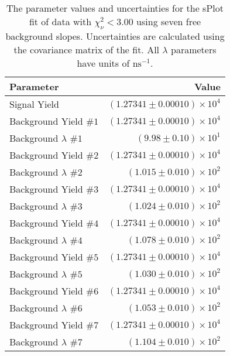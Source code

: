 
\begin{table}[ht]
    \begin{center}
        \begin{tabular}{lr}\toprule
            Parameter & Value \\\midrule
            Signal Yield & $(1.27341 \pm 0.00010) \times 10^{4}$ \\
            Background Yield $\#1$ & $(1.27341 \pm 0.00010) \times 10^{4}$ \\
            Background $\lambda$ $\#1$ & $(9.98 \pm 0.10) \times 10^{1}$ \\
            Background Yield $\#2$ & $(1.27341 \pm 0.00010) \times 10^{4}$ \\
            Background $\lambda$ $\#2$ & $(1.015 \pm 0.010) \times 10^{2}$ \\
            Background Yield $\#3$ & $(1.27341 \pm 0.00010) \times 10^{4}$ \\
            Background $\lambda$ $\#3$ & $(1.024 \pm 0.010) \times 10^{2}$ \\
            Background Yield $\#4$ & $(1.27341 \pm 0.00010) \times 10^{4}$ \\
            Background $\lambda$ $\#4$ & $(1.078 \pm 0.010) \times 10^{2}$ \\
            Background Yield $\#5$ & $(1.27341 \pm 0.00010) \times 10^{4}$ \\
            Background $\lambda$ $\#5$ & $(1.030 \pm 0.010) \times 10^{2}$ \\
            Background Yield $\#6$ & $(1.27341 \pm 0.00010) \times 10^{4}$ \\
            Background $\lambda$ $\#6$ & $(1.053 \pm 0.010) \times 10^{2}$ \\
            Background Yield $\#7$ & $(1.27341 \pm 0.00010) \times 10^{4}$ \\
            Background $\lambda$ $\#7$ & $(1.104 \pm 0.010) \times 10^{2}$ \\\bottomrule
        \end{tabular}
        \caption{The parameter values and uncertainties for the sPlot fit of data with $\chi^2_\nu < 3.00$ using seven free background slopes. Uncertainties are calculated using the covariance matrix of the fit. All $\lambda$ parameters have units of $\si{\nano\second}^{-1}$.}\label{tab:splot-fit-results-chisqdof-3.00-free-7}
    \end{center}
\end{table}
